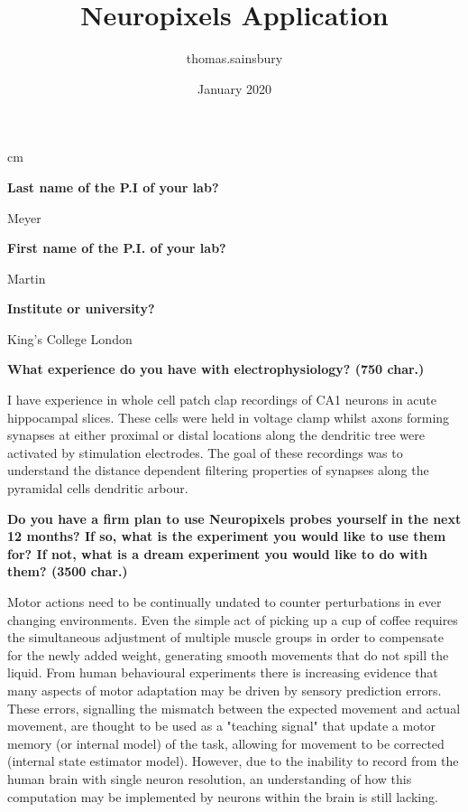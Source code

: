 \documentclass{article}
\title{Neuropixels Application}
\author{thomas.sainsbury }
\date{January 2020}
\begin{document}
\setlength\parindent{0pt}
 cm 
\maketitle

\textbf{Last name of the P.I of your lab?}

Meyer

\textbf{First name of the P.I. of your lab?}

Martin

\textbf{Institute or university?}

King's College London

\textbf{What experience do you have with electrophysiology? (750 char.) }

I have experience in whole cell patch clap recordings of CA1 neurons in acute hippocampal slices. These cells were held in voltage clamp whilst axons forming synapses at either proximal or distal locations along the dendritic tree were activated by stimulation electrodes. The goal of these recordings was to understand the distance dependent filtering properties of synapses along the pyramidal cells dendritic arbour.

\textbf{Do you have a firm plan to use Neuropixels probes yourself in the next 12 months? If so, what is the experiment you would like to use them for? If not, what is a dream experiment you would like to do with them? (3500 char.) }

 Motor actions need to be continually undated to counter perturbations in ever changing environments. Even the simple act of picking up a cup of coffee requires the simultaneous adjustment of multiple muscle groups in order to compensate for the newly added weight, generating smooth movements that do not spill the liquid. From human behavioural experiments there is increasing evidence that many aspects of motor adaptation may be driven by sensory prediction errors. These errors, signalling the mismatch between the expected movement and actual movement, are thought to be used as a "teaching signal" that update a motor memory (or internal model) of the task, allowing for movement to be corrected (internal state estimator model). However, due to the inability to record from the human brain with single neuron resolution, an understanding of how this computation may be implemented by neurons within the brain is still lacking.
\end{document}
